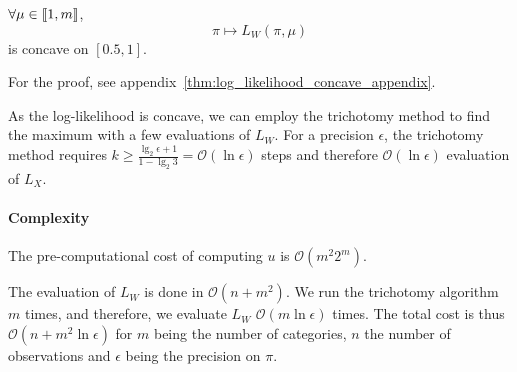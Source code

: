 \begin{thm}
    \label{thm:log_likelihood_concave}
    $\forall \mu \in \left\llbracket1, m\right\rrbracket$, 
    \[ \pi \mapsto L_W(\pi, \mu) \]
    is concave on $[0.5, 1]$.
\end{thm}

For the proof, see appendix~\ref{thm:log_likelihood_concave_appendix}.

As the log-likelihood is concave, we can employ the trichotomy method to find the maximum with a few evaluations of $L_W$. For a precision $\epsilon$, the trichotomy method requires $k \geq \frac{\lg_2 \epsilon + 1}{1 - \lg_2 3} = \mathcal O(\ln \epsilon)$ steps and therefore $\mathcal O(\ln \epsilon)$ evaluation of $L_X$.

\paragraph{Complexity}

The pre-computational cost of computing $u$ is $\mathcal O(m^2 2^m)$.

The evaluation of $L_W$ is done in $\mathcal O(n + m^2)$. We run the trichotomy algorithm $m$ times, and therefore, we evaluate $L_W$ $\mathcal O(m \ln \epsilon)$ times. The total cost is thus $\mathcal O(n + m^2 \ln \epsilon)$ for $m$ being the number of categories, $n$ the number of observations and $\epsilon$ being the precision on $\pi$.